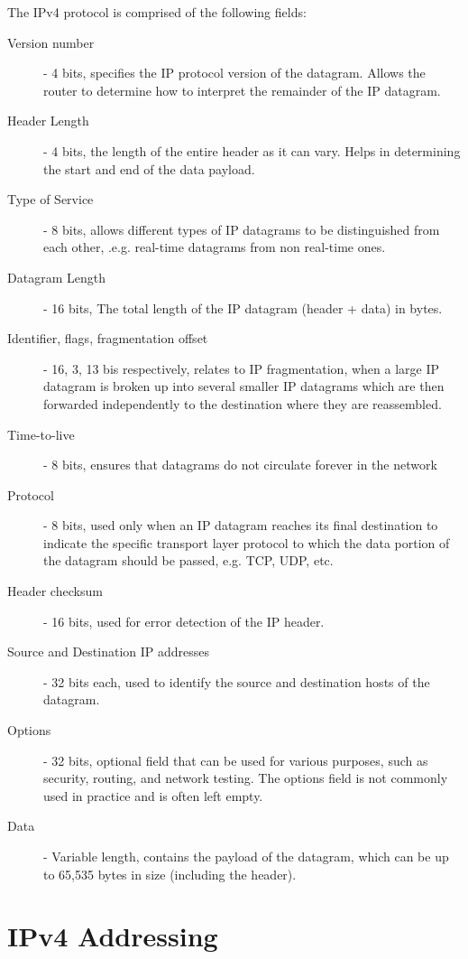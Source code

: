 \documentclass[12pt letter]{report}
\begin{document}
The IPv4 protocol is comprised of the following fields:
\begin{description}
  \item[Version number]  - 4 bits, specifies the IP protocol version
    of the datagram. Allows the router to determine how to interpret
    the remainder of the IP datagram.
  \item[Header Length] - 4 bits, the length of the entire header as
    it can vary. Helps in determining the start and end of the data payload.
  \item[Type of Service] - 8 bits, allows different types of IP
    datagrams to be distinguished from each other, .e.g. real-time
    datagrams from non real-time ones.
  \item[Datagram Length] - 16 bits, The total length of the IP
    datagram (header + data) in bytes.
  \item[Identifier, flags, fragmentation offset] - 16, 3, 13 bis
    respectively, relates to IP fragmentation, when a large IP
    datagram is broken up into several smaller IP datagrams which are
    then forwarded independently to the destination where they are reassembled.
  \item[Time-to-live] - 8 bits, ensures that datagrams do not
    circulate forever in the network
  \item[Protocol] - 8 bits, used only when an IP datagram reaches its
    final destination to indicate the specific transport layer
    protocol to which the data portion of the datagram should be
    passed, e.g. TCP, UDP, etc.
  \item[Header checksum] - 16 bits, used for error detection of the IP header.
  \item[Source and Destination IP addresses] - 32 bits each, used to
    identify the source and
    destination hosts of the datagram.
  \item[Options] - 32 bits, optional field that can be used for
    various purposes, such as security, routing, and network testing.
    The options field is not commonly used in practice and is often left empty.
  \item[Data] - Variable length, contains the payload of the datagram, which
    can be up to 65,535 bytes in size (including the header).
\end{description}

\section{IPv4 Addressing}
\end{document}
